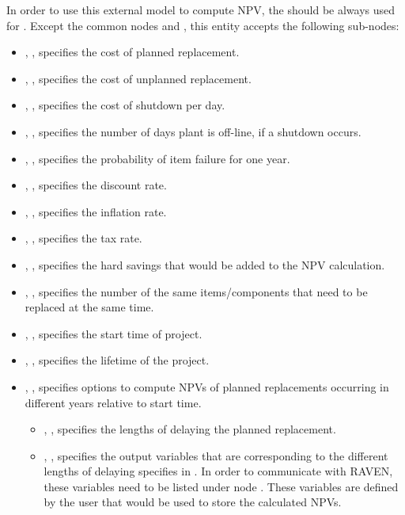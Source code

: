 In order to use this external model to compute NPV, the 
should be always used for . Except the common nodes 
and , this entity accepts the following sub-nodes:
\begin{itemize}
  \item {}, , specifies the cost of planned replacement.
  \item {}, , specifies the cost of unplanned replacement.
  \item {}, , specifies the cost of shutdown per day.
  \item {}, , specifies the number of days
  plant is off-line, if a shutdown occurs.
  \item {}, , specifies the probability
  of item failure for one year.
  \item {}, , specifies the discount rate.
  \item {}, , specifies the inflation rate.
  \item {}, , specifies the tax rate.
  \item {}, , specifies the hard
  savings that would be added to the NPV calculation.
  \item {}, , specifies the number
  of the same items/components that need to be replaced at the same time.
  \item {}, , specifies the
  start time of project.
  \item {}, , specifies the lifetime
  of the project.
  \item {}, , specifies options to compute
  NPVs of planned replacements occurring in different years relative to start time.
  \begin{itemize}
    \item {}, ,
    specifies the lengths of delaying the planned replacement.
    \item {}, ,
    specifies the output variables that are corresponding to the different lengths of
    delaying specifies in . In order to communicate with RAVEN, these
    variables need to be listed under node .
    \nb These variables are defined by the user that would be used to store the
    calculated NPVs.
  \end{itemize}
\end{itemize}

